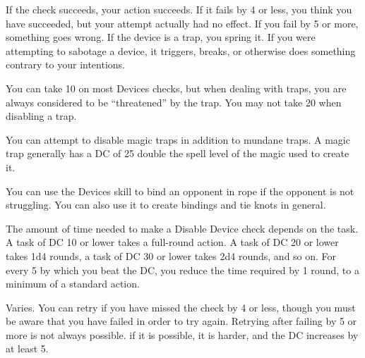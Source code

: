 If the check succeeds, your action succeeds. If it fails by 4 or less, you think you have succeeded, but your attempt actually had no effect. If you fail by 5 or more, something goes wrong. If the device is a trap, you spring it. If you were attempting to sabotage a device, it triggers, breaks, or otherwise does something contrary to your intentions.

You can take 10 on most Devices checks, but when dealing with traps, you are always considered to be ``threatened'' by the trap. You may not take 20 when disabling a trap.

\par You can attempt to disable magic traps in addition to mundane traps. A magic trap generally has a DC of 25 \add double the spell level of the magic used to create it.

 You can use the Devices skill to bind an opponent in rope if the opponent is not struggling. You can also use it to create bindings and tie knots in general.

 The amount of time needed to make a Disable Device check depends on the task. A task of DC 10 or lower takes a full-round action. A task of DC 20 or lower takes 1d4 rounds, a task of DC 30 or lower takes 2d4 rounds, and so on. For every 5 by which you beat the DC, you reduce the time required by 1 round, to a minimum of a standard action.

 Varies. You can retry if you have missed the check by 4 or less, though you must be aware that you have failed in order to try again. Retrying after failing by 5 or more is not always possible. if it is possible, it is harder, and the DC increases by at least 5.

